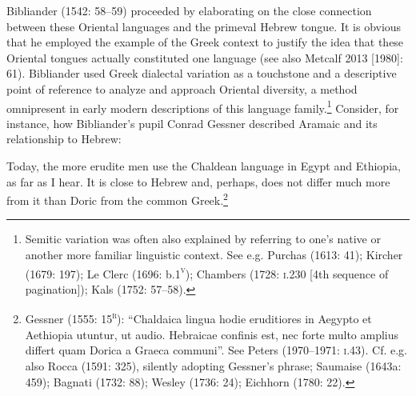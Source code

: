 \begin{styleStandard}
Bibliander (1542: 58–59) proceeded by elaborating on the close connection between these Oriental languages and the primeval Hebrew tongue. It is obvious that he employed the example of the Greek context to justify the idea that these Oriental tongues actually constituted one language (see also Metcalf 2013 [1980]: 61). Bibliander used Greek dialectal variation as a touchstone and a descriptive point of reference to analyze and approach Oriental diversity, a method omnipresent in early modern descriptions of this language family.\footnote{ Semitic variation was often also explained by referring to one’s native or another more familiar linguistic context. See e.g. Purchas (1613: 41); Kircher (1679: 197); Le Clerc (1696: b.1\textsc{\textsuperscript{v}}); Chambers (1728: \textsc{i.}230 [4th sequence of pagination]); Kals (1752: 57–58).} Consider, for instance, how Bibliander’s pupil Conrad Gessner described Aramaic and its relationship to Hebrew:
\end{styleStandard}

\begin{styleQuote}
Today, the more erudite men use the Chaldean language in Egypt and Ethiopia, as far as I hear. It is close to Hebrew and, perhaps, does not differ much more from it than Doric from the common Greek.\footnote{ Gessner (1555: 15\textsc{\textsuperscript{r}}): “Chaldaica lingua hodie eruditiores in Aegypto et Aethiopia utuntur, ut audio. Hebraicae confinis est, nec forte multo amplius differt quam Dorica a Graeca communi”. See Peters (1970–1971: \textsc{i.}43). Cf. e.g. also Rocca (1591: 325), silently adopting Gessner’s phrase; Saumaise (1643a: 459); Bagnati (1732: 88); Wesley (1736: 24); Eichhorn (1780: 22).}
\end{styleQuote}

